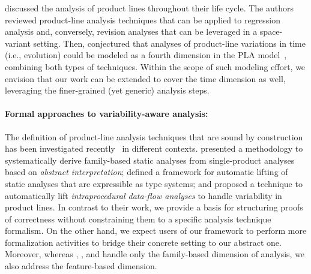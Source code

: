 \citet{SPLAnalysisTime} discussed the analysis of product lines throughout their
life cycle.
The authors reviewed product-line analysis techniques that can be applied to
regression analysis and, conversely, revision analyses that can be leveraged in a
space-variant setting.
Then, \citet{SPLAnalysisTime} conjectured that analyses of product-line variations
in time (i.e., evolution) could be modeled as a fourth dimension in the PLA
model~\cite{PLAModel}, combining both types of techniques.
Within the scope of such modeling effort, we envision that our work can be
extended to cover the time dimension as well, leveraging the finer-grained (yet generic) analysis steps.

\paragraph{Formal approaches to variability-aware analysis:}
The definition of product-line analysis techniques that are sound by construction has been investigated
recently~\cite{Midtgaard2015,ErwigAnalysis,Intraprocedural} in different contexts.
\citet{Midtgaard2015} presented a methodology to systematically derive family-based static analyses from single-product analyses
based on \emph{abstract interpretation};
\citet{ErwigAnalysis} defined a framework for automatic lifting of
static analyses that are expressible as type systems;
and \citet{Intraprocedural} proposed a
technique to automatically lift \emph{intraprocedural data-flow analyses} to handle
variability in product lines.
In contrast to their work, we provide a basis for structuring proofs of correctness
without constraining them to a specific analysis technique formalism.
On the other hand, we expect users of our framework to perform more formalization
activities to bridge their concrete setting to our abstract one.
Moreover, whereas \citet{Midtgaard2015}, \citet{ErwigAnalysis}, and
\citet{Intraprocedural} handle only the family-based
dimension of analysis,
we also address the feature-based dimension.


